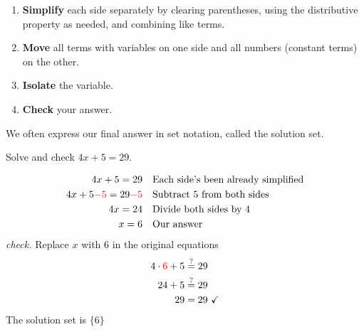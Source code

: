 \begin{tcolorbox}[title=Steps to solve an equation,
                colframe=blue!75!red,
                colback=white,
                fonttitle=\bfseries ]
 \begin{enumerate}[(1)]
     \item \textbf{Simplify} each side separately by clearing parentheses, using the distributive property as needed, and combining like terms.
     \item  \textbf{Move} all terms with variables on one side and all numbers (constant terms) on the other.
     \item \textbf{Isolate} the variable.
     \item \textbf{Check} your answer.
 \end{enumerate}   
\end{tcolorbox}
We often express our final answer in set notation, called the solution set. 
\begin{exa}
    Solve and check $4x+5=29$.
\end{exa}
\begin{align*}
    4x+5= 29&   &   &\text{Each side's been already simplified}\\
    4x+5\textcolor{red}{-5} = 29 \textcolor{red}{-5}&   &
    &\text{Subtract 5 from both sides}\\
    4x = 24&    &   &\text{Divide both sides by 4}\\
    x = 6&  &   &\text{Our answer}
\end{align*}
\textit{check.} Replace $x$ with 6 in the original equations
\begin{align*}
    4\cdot\textcolor{red}{6} +5 & \stackrel{?}{=} 29 \\
    24+5 & \stackrel{?}{=} 29\\
    29 & = 29\ \checkmark 
\end{align*}
The solution set is $\{6\}$

